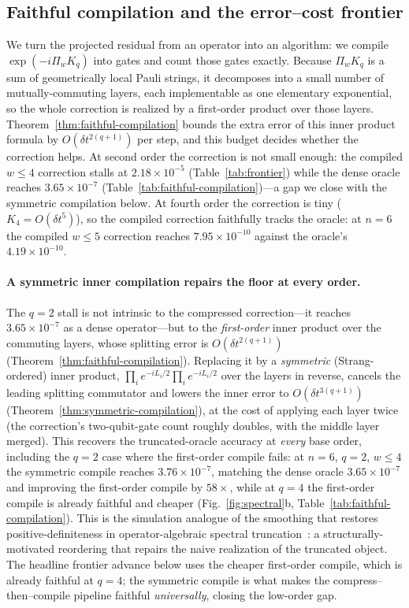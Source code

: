 \documentclass[aps,prresearch,reprint,superscriptaddress,nofootinbib,amsmath,amssymb]{revtex4-2}
\newcommand{\dt}{\delta t}
\begin{document}


\subsection{Faithful compilation and the error--cost frontier}
\label{sec:frontier}

We turn the projected residual from an operator into an algorithm: we compile $\exp(-i\Pi_wK_q)$ into gates and count those gates exactly. Because $\Pi_wK_q$ is a sum of geometrically local Pauli strings, it decomposes into a small number of mutually-commuting layers, each implementable as one elementary exponential, so the whole correction is realized by a first-order product over those layers. Theorem~\ref{thm:faithful-compilation} bounds the extra error of this inner product formula by $O(\dt^{2(q+1)})$ per step, and this budget decides whether the correction helps. At second order the correction is not small enough: the compiled $w\leq4$ correction stalls at $2.18\times10^{-5}$ (Table~\ref{tab:frontier}) while the dense oracle reaches $3.65\times10^{-7}$ (Table~\ref{tab:faithful-compilation})---a gap we close with the symmetric compilation below. At fourth order the correction is tiny ($K_4=O(\dt^5)$), so the compiled correction faithfully tracks the oracle: at $n=6$ the compiled $w\leq5$ correction reaches $7.95\times10^{-10}$ against the oracle's $4.19\times10^{-10}$.

\paragraph{A symmetric inner compilation repairs the floor at every order.} The $q=2$ stall is not intrinsic to the compressed correction---it reaches $3.65\times10^{-7}$ as a dense operator---but to the \emph{first-order} inner product over the commuting layers, whose splitting error is $O(\dt^{2(q+1)})$ (Theorem~\ref{thm:faithful-compilation}). Replacing it by a \emph{symmetric} (Strang-ordered) inner product, $\prod_i e^{-iL_i/2}\prod_i e^{-iL_i/2}$ over the layers in reverse, cancels the leading splitting commutator and lowers the inner error to $O(\dt^{3(q+1)})$ (Theorem~\ref{thm:symmetric-compilation}), at the cost of applying each layer twice (the correction's two-qubit-gate count roughly doubles, with the middle layer merged). This recovers the truncated-oracle accuracy at \emph{every} base order, including the $q=2$ case where the first-order compile fails: at $n=6$, $q=2$, $w\le4$ the symmetric compile reaches $3.76\times10^{-7}$, matching the dense oracle $3.65\times10^{-7}$ and improving the first-order compile by $58\times$, while at $q=4$ the first-order compile is already faithful and cheaper (Fig.~\ref{fig:spectral}b, Table~\ref{tab:faithful-compilation}). This is the simulation analogue of the smoothing that restores positive-definiteness in operator-algebraic spectral truncation~\cite{hashimoto2024spectral}: a structurally-motivated reordering that repairs the naive realization of the truncated object. The headline frontier advance below uses the cheaper first-order compile, which is already faithful at $q=4$; the symmetric compile is what makes the compress--then--compile pipeline faithful \emph{universally}, closing the low-order gap.
\end{document}
